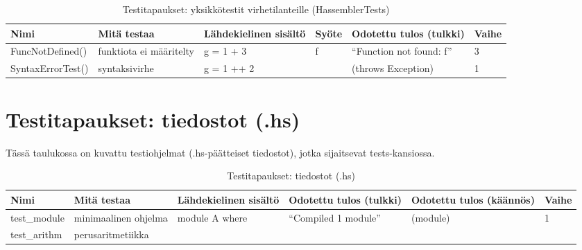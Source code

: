 \documentclass[11pt]{article} %
\begin{document}
\begin{table}[!htbp] %
\caption{Testitapaukset: yksikkötestit virhetilanteille (HassemblerTests)}
\begin{tabular}{|p{3cm}|p{}|p{3cm}|p{}|p{}|p{2cm}|}
\hline
\textbf{Nimi} & \textbf{Mitä testaa} & \textbf{Lähdekielinen sisältö} & \textbf{Syöte}  & \textbf{Odotettu tulos (tulkki)}  & \textbf{Vaihe} \\ \hline
 FuncNotDefined()  & funktiota ei määritelty   &  g = 1 + 3       &  f       &  ``Function not found: f''   &  3            \\ \hline
 SyntaxErrorTest()     & syntaksivirhe   &  g = 1 ++ 2    &           &   (throws Exception)   &    1     \\ \hline
              
             
\end{tabular}
\end{table}


\section{Testitapaukset: tiedostot (.hs)}


Tässä taulukossa on kuvattu testiohjelmat (.hs-päätteiset tiedostot), jotka sijaitsevat tests-kansiossa.

\begin{table}[!htbp] %
\caption{Testitapaukset: tiedostot (.hs)}
\begin{tabular}{|p{}|p{}|p{}|p{2cm}|p{3cm}|p{2cm}|}
\hline
\textbf{Nimi} & \textbf{Mitä testaa} & \textbf{Lähdekielinen sisältö} & \textbf{Odotettu tulos (tulkki)} & \textbf{Odotettu tulos (käännös)} & \textbf{Vaihe} \\ \hline
test\_module  &  minimaalinen ohjelma  & module A where &  ``Compiled 1 module''                     &    (module)                 & 1   \\ \hline
 test\_arithm     & perus\-aritmetiikka         &  &                                  &                                   &                \\ \hline
             
\end{tabular}
\end{table}
\end{document}
